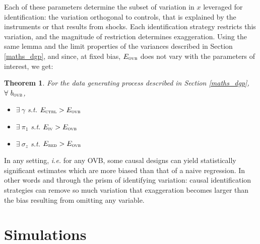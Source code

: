 \documentclass[usletter, 12pt]{article}
\newtheorem{theorem}{Theorem}
\begin{document}
			Each of these parameters determine the subset of variation in $x$ leveraged for identification: the variation orthogonal to controls, that is explained by the instruments or that results from shocks. Each identification strategy restricts this variation, and the magnitude of restriction determines exaggeration. Using the same lemma and the limit properties of the variances described in Section \ref{maths_dgp}, and since, at fixed bias, $E_{\textsc{ovb}}$ does not vary with the parameters of interest, we get:
			~
			\begin{theorem}
				For the data generating process described in Section \ref{maths_dgp}, $\forall \ b_{\textsc{ovb}}$,
					\begin{itemize}
						\item $\exists \ \gamma$ s.t. $E_{\textsc{ctrl}} > E_{\textsc{ovb}}$
						\item $\exists \ \pi_{1}$ s.t. $E_{\textsc{iv}} > E_{\textsc{ovb}}$
						\item $\exists \ \sigma_{z}$ s.t. $E_{\textsc{red}} > E_{\textsc{ovb}}$
					\end{itemize}
			\end{theorem}
			
			In any setting, \textit{i.e.} for any OVB, some causal designs can yield statistically significant estimates which are more biased than that of a naive regression. In other words and through the prism of identifying variation: causal identification strategies can remove so much variation that exaggeration becomes larger than the bias resulting from omitting any variable.
	


				
	\section{Simulations} \label{simulations}
		
    
\end{document}
